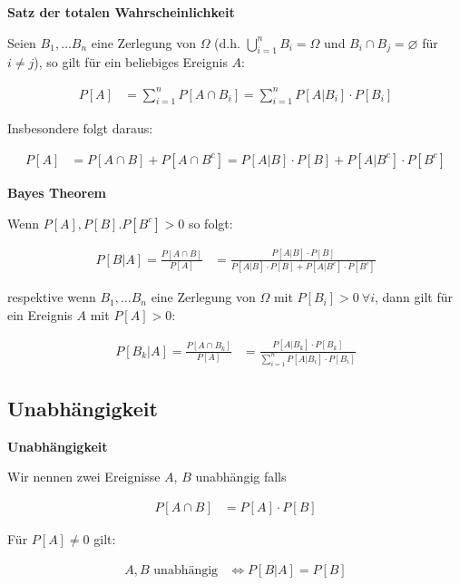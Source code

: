 \documentclass[25pt]{sciposter}
\newenvironment{method}[1]{\begin{mdframed}[backgroundcolor=blue!10,innertopmargin=15pt, innerbottommargin=15pt,nobreak=true]
		\textbf{#1 }
	}
	{ 
	\end{mdframed}
}
\newenvironment{thm}[1]{\begin{mdframed}[backgroundcolor=pink!20,innertopmargin=15pt, innerbottommargin=15pt, nobreak=true]
		\textbf{#1 }
	}
	{ 
	\end{mdframed}
}
\begin{document}
\begin{multicols}{3}
\begin{thm}{Satz der totalen Wahrscheinlichkeit}
	 Seien $B_1, \ldots B_n$ eine Zerlegung von $\Omega$ (d.h. $\bigcup_{i=1}^n B_i = \Omega$ und $B_i \cap B_j = \varnothing$ für $i\neq j$), so gilt für ein beliebiges Ereignis $A$:
	 
	 \begin{align*}
	 	P[A] &= \sum_{i=1}^{n} P[A\cap B_i] = \sum_{i=1}^{n} P[A|B_i]\cdot P[B_i]
	 \end{align*}
	 
	 Insbesondere folgt daraus:
	 
	 \begin{align*}
	 	P[A] &= P[A\cap B] + P[A \cap B^c] = P[A|B]\cdot P[B] + P[A|B^c]\cdot P[B^c]
	 \end{align*}
\end{thm}


\begin{thm}{Bayes Theorem}
	Wenn $P[A],P[B].P[B^c]> 0$ so folgt:
	
	\begin{align*}
		P[B|A] = \frac{P[A\cap B]}{P[A]} &= \frac{P[A|B]\cdot P[B]}{P[A|B]\cdot P[B] + P[A|B^c]\cdot P[B^c]}
	\end{align*}
	
	respektive wenn $B_1, \ldots B_n$ eine Zerlegung von $\Omega$ mit $P[B_i]>0 \  \forall i$, dann gilt für ein Ereignis $A$ mit $P[A]>0$:
	
	\begin{align*}
		P[B_k|A] = \frac{P[A\cap B_k]}{P[A]} &= \frac{P[A|B_k]\cdot P[B_k]}{\sum_{i=1}^{n} P[A|B_i] \cdot P[B_i] }
	\end{align*}
\end{thm}


\subsection*{Unabhängigkeit}

\begin{method}{Unabhängigkeit}
	Wir nennen zwei Ereignisse $A$, $B$ unabhängig falls
	
	\begin{align*}
		P[A\cap B] &= P[A] \cdot P[B]
	\end{align*}
	
	Für $P[A] \neq 0$ gilt:
	
	\begin{align*}
		\text{$A,B$ unabhängig} &\iff P[B|A] = P[B]
	\end{align*}
	

\end{method}
\end{multicols}
\end{document}
